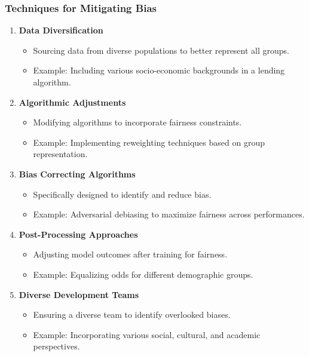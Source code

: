\documentclass{beamer}
\begin{document}
\begin{frame}[fragile]
    \frametitle{Techniques for Mitigating Bias}
    \begin{enumerate}
        \item \textbf{Data Diversification}
            \begin{itemize}
                \item Sourcing data from diverse populations to better represent all groups.
                \item Example: Including various socio-economic backgrounds in a lending algorithm.
            \end{itemize}
        \item \textbf{Algorithmic Adjustments}
            \begin{itemize}
                \item Modifying algorithms to incorporate fairness constraints.
                \item Example: Implementing reweighting techniques based on group representation.
            \end{itemize}
        \item \textbf{Bias Correcting Algorithms}
            \begin{itemize}
                \item Specifically designed to identify and reduce bias.
                \item Example: Adversarial debiasing to maximize fairness across performances.
            \end{itemize}
        \item \textbf{Post-Processing Approaches}
            \begin{itemize}
                \item Adjusting model outcomes after training for fairness.
                \item Example: Equalizing odds for different demographic groups.
            \end{itemize}
        \item \textbf{Diverse Development Teams}
            \begin{itemize}
                \item Ensuring a diverse team to identify overlooked biases.
                \item Example: Incorporating various social, cultural, and academic perspectives.
            \end{itemize}
    \end{enumerate}
\end{frame}
\end{document}
